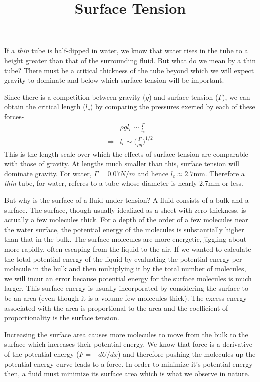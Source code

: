 \documentclass[11pt,a4paper]{article}
\title{Surface Tension}
\date{\displaydate{date}}
\author{}
\newcommand{\1}{\vect{1}}
\newcommand{\lc}{l_c}
\begin{document}
\maketitle

If a \textit{thin} tube is half-dipped in water, we know that water rises in the tube to a height greater than that of the surrounding fluid. But what do we mean by a thin tube? There must be a critical thickness of the tube beyond which we will expect gravity to dominate and below which surface tension will be important.

Since there is a competition between gravity ($g$) and surface tension ($\Gamma$), we can obtain the critical length ($\lc$) by comparing the pressures exerted by each of these forces-
\begin{align*}
&\rho g \lc \sim \frac{\Gamma}{\lc}\\
\Rightarrow &\lc \sim \bigg(\frac{\Gamma}{\rho g}\bigg)^{1/2}
\end{align*}
This is the length scale over which the effects of surface tension are comparable with those of gravity. At lengths much smaller than this, surface tension will dominate gravity. For water, $\Gamma = 0.07 N/m$ and hence $l_c \approx 2.7$mm. Therefore a \textit{thin} tube, for water, referes to a tube whose diameter is nearly 2.7mm or less.

But why is the surface of a fluid under tension? A fluid consists of a bulk and a surface. The surface, though usually idealized as a sheet with zero thickness, is actually a few molecules thick. For a depth of the order of a few molecules near the water surface, the potential energy of the molecules is substantially higher than that in the bulk. The surface molecules are more energetic, jiggling about more rapidly, often escaping from the liquid to the air. If we wanted to calculate the total potential energy of the liquid by evaluating the potential energy per molecule in the bulk and then multiplying it by the total number of molecules, we will incur an error because potential energy for the surface molecules is much larger. This surface energy is usually incorporated by considering the surface to be an area (even though it is a volume few molecules thick). The excess energy associated with the area is proportional to the area and the coefficient of proportionality is the surface tension. 

Increasing the surface area causes more molecules to move from the bulk to the surface which increases their potential energy. We know that force is a derivative of the potential energy ($F=-dU/dx$) and therefore pushing the molecules up the potential energy curve leads to a force. In order to minimize it's potential energy then, a fluid must minimize its surface area which is what we observe in nature.
\end{document}
